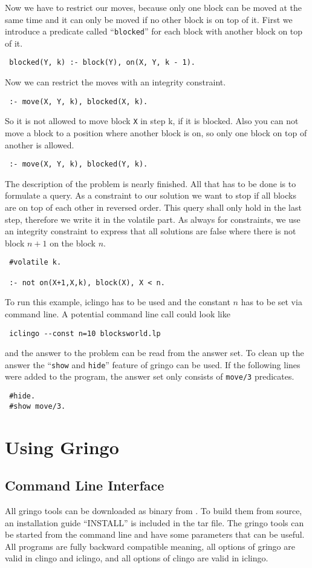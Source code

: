 \documentclass[a4paper,10pt]{article}
\begin{document}
Now we have to restrict our moves, because only one block can be moved at the same time and it can only be moved if no other block is on top of it.
First we introduce a predicate called ``\texttt{blocked}'' for each block with another block on top of it.
\begin{verbatim}
 blocked(Y, k) :- block(Y), on(X, Y, k - 1).
\end{verbatim}
Now we can restrict the moves with an integrity constraint.
\begin{verbatim}
 :- move(X, Y, k), blocked(X, k).
\end{verbatim}
So it is not allowed to move block \texttt{X} in step k, if it is blocked.
Also you can not move a block to a position where another block is on, so only one block on top of another is allowed.
\begin{verbatim}
 :- move(X, Y, k), blocked(Y, k).
\end{verbatim}
The description of the problem is nearly finished. All that has to be done is to formulate a query.
As a constraint to our solution we want to stop if all blocks are on top of each other in reversed order.
This query shall only hold in the last step, therefore we write it in the volatile part.
As always for constraints, we use an integrity constraint to express that all solutions are false where there is not block $n+1$ on the block $n$.
\begin{verbatim}
 #volatile k.

 :- not on(X+1,X,k), block(X), X < n.
\end{verbatim}
To run this example, iclingo has to be used and the constant $n$ has to be set via command line.
A potential command line call could look like
\begin{verbatim}
 iclingo --const n=10 blocksworld.lp
\end{verbatim}
and the answer to the problem can be read from the answer set.
To clean up the answer the ``\texttt{show} and \texttt{hide}'' feature of gringo can be used.
If the following lines were added to the program, the answer set only consists of \texttt{move/3} predicates.
\begin{verbatim}
 #hide.
 #show move/3.
\end{verbatim}


\section{Using Gringo}
\subsection{Command Line Interface}
All gringo tools can be downloaded as binary from \cite{download}. To build them from source, an installation guide ``INSTALL'' is included in the tar file.
The gringo tools can be started from the command line and have some parameters that can be useful.
All programs are fully backward compatible meaning, all options of gringo are valid in clingo and iclingo, and all options of clingo are valid in iclingo.
\end{document}
